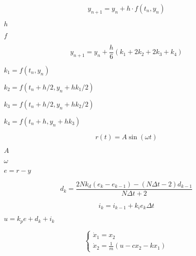 \documentclass{article}
\begin{document}
\[y_{n+1} = y_n + h \cdot f(t_n, y_n)
\]
\pagebreak

$ h $
\pagebreak

$ f $
\pagebreak

\[y_{n+1} = y_n + \frac{h}{6}(k_1 + 2k_2 + 2k_3 + k_4)
\]
\pagebreak

$ k_1 = f(t_n, y_n) $
\pagebreak

$ k_2 = f(t_n + h/2, y_n + hk_1/2) $
\pagebreak

$ k_3 = f(t_n + h/2, y_n + hk_2/2) $
\pagebreak

$ k_4 = f(t_n + h, y_n + hk_3) $
\pagebreak

\[r(t) = A \sin(\omega t)
\]
\pagebreak

$ A $
\pagebreak

$ \omega $
\pagebreak

$ e = r - y $
\pagebreak

\[d_k = \frac{2Nk_d(e_k - e_{k-1}) - (N\Delta t - 2)d_{k-1}}{N\Delta t + 2}
\]
\pagebreak

\[i_k = i_{k-1} + k_i e_k \Delta t
\]
\pagebreak

$ u = k_p e + d_k + i_k $
\pagebreak

\[\begin{cases}
\dot{x}_1 = x_2 \\
\dot{x}_2 = \frac{1}{m}(u - c x_2 - k x_1)
\end{cases}
\]
\pagebreak
\end{document}
